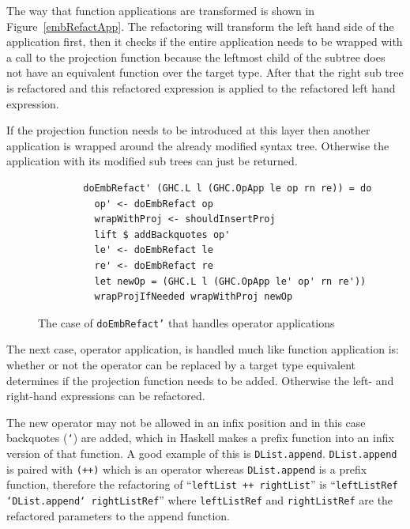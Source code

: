 The way that function applications are transformed is shown in Figure~\ref{embRefactApp}. The refactoring will transform the left hand side of the application first, then it checks if the entire application needs to be wrapped with a call to the projection function because the leftmost child of the subtree does not have an equivalent function over the target type. After that the right sub tree is refactored and this refactored expression is applied to the refactored left hand expression.

If the projection function needs to be introduced at this layer then another application is wrapped around the already modified syntax tree. Otherwise the application with its modified sub trees can just be returned.

\begin{figure}[t]
\begin{lstlisting}
        doEmbRefact' (GHC.L l (GHC.OpApp le op rn re)) = do
          op' <- doEmbRefact op
          wrapWithProj <- shouldInsertProj
          lift $ addBackquotes op'
          le' <- doEmbRefact le
          re' <- doEmbRefact re
          let newOp = (GHC.L l (GHC.OpApp le' op' rn re'))
          wrapProjIfNeeded wrapWithProj newOp
\end{lstlisting}
\caption{The case of \texttt{doEmbRefact'} that handles operator applications}
\label{embRefactOp}
\end{figure}

The next case, operator application, is handled much like function application is: whether or not the operator can be replaced by a target type equivalent determines if the projection function needs to be added. Otherwise the left- and right-hand expressions can be refactored. 

The new operator may not be allowed in an infix position and in this case backquotes (\texttt{`}) are added, which in Haskell makes a prefix function into an infix version of that function. A good example of this is \texttt{DList.append}. \texttt{DList.append} is paired with \texttt{(++)} which is an operator whereas \texttt{DList.append} is a prefix function, therefore the refactoring of ``\texttt{leftList ++ rightList}'' is ``\texttt{leftListRef `DList.append` rightListRef}'' where \texttt{leftListRef} and \texttt{rightListRef} are the refactored parameters to the append function.

